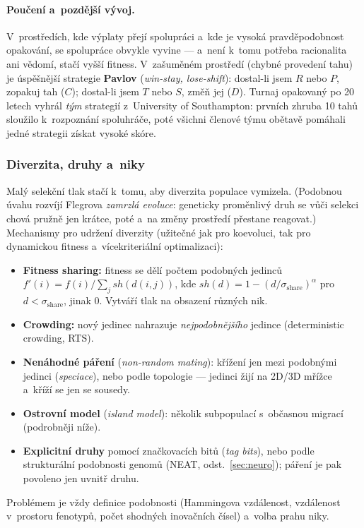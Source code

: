 \documentclass[11pt,a4paper]{article}
\theoremstyle{definition}
\begin{document}
\paragraph{Poučení a~pozdější vývoj.} V~prostředích, kde výplaty přejí
spolupráci a~kde je vysoká pravděpodobnost opakování, se spolupráce obvykle
vyvine --- a~není k~tomu potřeba racionalita ani vědomí, stačí vyšší fitness.
V~zašuměném prostředí (chybné provedení tahu) je úspěšnější strategie
\textbf{Pavlov} (\emph{win-stay, lose-shift}): dostal-li jsem $R$ nebo $P$,
zopakuj tah ($C$); dostal-li jsem $T$ nebo $S$, změň jej ($D$).
Turnaj opakovaný po 20 letech vyhrál \emph{tým} strategií z~University of
Southampton: prvních zhruba 10 tahů sloužilo k~rozpoznání spoluhráče,
poté všichni členové týmu obětavě pomáhali jedné  strategii
získat vysoké skóre.

\subsubsection{Diverzita, druhy a~niky}

Malý selekční tlak stačí k~tomu, aby diverzita populace vymizela. (Podobnou
úvahu rozvíjí Flegrova \emph{zamrzlá evoluce}: geneticky proměnlivý druh
se vůči selekci chová pružně jen krátce, poté  a~na změny
prostředí přestane reagovat.) Mechanismy pro udržení diverzity (užitečné
jak pro koevoluci, tak pro dynamickou fitness a~vícekriteriální optimalizaci):
\begin{itemize}
\item \textbf{Fitness sharing:} fitness se dělí počtem podobných jedinců
  $f'(i) = f(i)/\sum_j sh(d(i,j))$, kde
  $sh(d) = 1-(d/\sigma_{\mathrm{share}})^{\alpha}$ pro $d < \sigma_{\mathrm{share}}$,
  jinak 0. Vytváří tlak na obsazení různých nik.
\item \textbf{Crowding:} nový jedinec nahrazuje \emph{nejpodobnějšího}
  jedince (deterministic crowding, RTS).
\item \textbf{Nenáhodné páření} (\emph{non-random mating}): křížení jen mezi
  podobnými jedinci (\emph{speciace}), nebo podle topologie --- jedinci žijí
  na 2D/3D mřížce a~kříží se jen se sousedy.
\item \textbf{Ostrovní model} (\emph{island model}): několik subpopulací
  s~občasnou migrací (podrobněji níže).
\item \textbf{Explicitní druhy} pomocí značkovacích bitů (\emph{tag bits}),
  nebo podle strukturální podobnosti genomů (NEAT, odst.~\ref{sec:neuro});
  páření je pak povoleno jen uvnitř druhu.
\end{itemize}
Problémem je vždy definice podobnosti (Hammingova vzdálenost, vzdálenost
v~prostoru fenotypů, počet shodných inovačních čísel) a~volba prahu niky.
\end{document}
